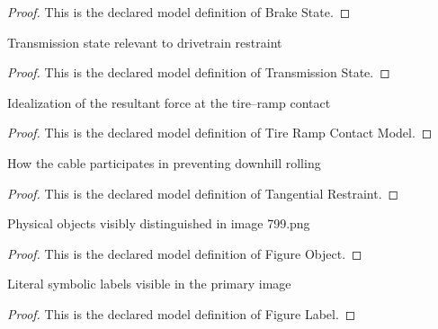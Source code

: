 \begin{proof}
  This is the declared model definition of Brake State.
\end{proof}
\begin{definition}
  \label{def:physics:phyx-mini-0799:phyxminiproblems-problemphyxmini0799-transmissionstate}
  Transmission state relevant to drivetrain restraint
\end{definition}
\begin{proof}
  This is the declared model definition of Transmission State.
\end{proof}
\begin{definition}
  \label{def:physics:phyx-mini-0799:phyxminiproblems-problemphyxmini0799-tirerampcontactmodel}
  Idealization of the resultant force at the tire--ramp contact
\end{definition}
\begin{proof}
  This is the declared model definition of Tire Ramp Contact Model.
\end{proof}
\begin{definition}
  \label{def:physics:phyx-mini-0799:phyxminiproblems-problemphyxmini0799-tangentialrestraint}
  How the cable participates in preventing downhill rolling
\end{definition}
\begin{proof}
  This is the declared model definition of Tangential Restraint.
\end{proof}
\begin{definition}
  \label{def:physics:phyx-mini-0799:phyxminiproblems-problemphyxmini0799-figureobject}
  Physical objects visibly distinguished in image 799.png
\end{definition}
\begin{proof}
  This is the declared model definition of Figure Object.
\end{proof}
\begin{definition}
  \label{def:physics:phyx-mini-0799:phyxminiproblems-problemphyxmini0799-figurelabel}
  Literal symbolic labels visible in the primary image
\end{definition}
\begin{proof}
  This is the declared model definition of Figure Label.
\end{proof}
